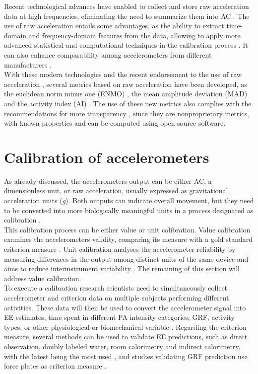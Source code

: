 \documentclass[11pt]{article}
\begin{document}
Recent technological advances have enabled to collect and store raw acceleration data at high frequencies, eliminating the need to summarize them into AC \cite{Bakrania_2016}. The use of raw acceleration entails some advantages, as the ability to extract time-domain and frequency-domain features from the data, allowing to apply more advanced statistical and computational techniques in the calibration process \cite{John_2013}. It can also enhance comparability among accelerometers from different manufacturers \cite{Mendes_2018, Rowlands_2016}. \\

With these modern technologies and the recent endorsement to the use of raw acceleration \cite{Freedson_2012}, several metrics based on raw acceleration have been developed, as the euclidean norm minus one (ENMO) \cite{vanHees_2013}, the mean amplitude deviation (MAD) \cite{Vaha-Ypya_2015} and the activity index (AI) \cite{Bai_2016}. The use of these new metrics also complies with the recommendations for more transparency \cite{Intille_2012}, since they are nonproprietary metrics, with known properties and can be computed using open-source software.

\section*{Calibration of accelerometers}

As already discussed, the accelerometers output can be either AC, a dimensionless unit, or raw acceleration, usually expressed as gravitational acceleration units (\textit{g}). Both outputs can indicate overall movement, but they need to be converted into more biologically meaningful units in a process designated as calibration \cite{Welk_2005}. \\

 This calibration process can be either value or unit calibration. Value calibration examines the accelerometers validity, comparing its measure with a gold standard criterion measure \cite{Basset_2012}. Unit calibration analyses the accelerometer reliability by measuring differences in the output among distinct units of the same device and aims to reduce interinstrument variability \cite{Welk_2005, Basset_2012}. The remaining of this section will address value calibration. \\

To execute a calibration research scientists need to simultaneously collect accelerometer and criterion data on multiple subjects performing different activities. These data will then be used to convert the accelerometer signal into EE estimates, time spent in different PA intensity categories, GRF, activity types, or other physiological or biomechanical variable \cite{Basset_2012}. Regarding the criterion measure, several methods can be used to validate EE predictions, such as direct observation, doubly labeled water, room calorimetry and indirect calorimetry, with the latest being the most used \cite{Basset_2012, Mendes_2018}, and studies validating GRF prediction use force plates as criterion measure \cite{Neugebauer_2018, Neugebauer_2014, Fortune_2014}. \\
\end{document}
